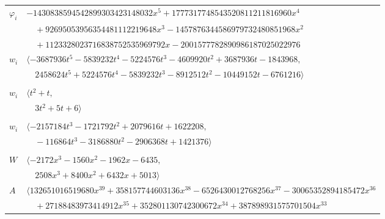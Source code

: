 \documentclass[11pt]{article}
\begin{document}
\begin{longtable}{@{}ll@{}}
$\varphi_i$ & $-1430838594542899303423148032x^{5}+1777317748543520811211816960x^{4}$\\
 & $\quad +92695053956354481112219648x^{3}-1457876344586979732480851968x^{2}$\\
 & $\quad +1123328023716838752535969792x-2001577782890986187025022976$\\
$w_i$ & $\langle -3687936t^{5}-5839232t^{4}-5224576t^{3}-4609920t^{2}+3687936t-1843968,$\\
 & $\quad 2458624t^{5}+5224576t^{4}-5839232t^{3}-8912512t^{2}-10449152t-6761216\rangle$\\
\addlinespace[2pt]
\multicolumn{2}{@{}p{0.97\textwidth}@{}}{$i=7$, $D_i=1$, $\varphi_i=1$, $\rho_{ij}$: $6{:}1, \allowbreak 12{:}1, \allowbreak 17{:}2, \allowbreak 20{:}2, \allowbreak 21{:}2, \allowbreak 37{:}3, \allowbreak 38{:}2$}\\
$w_i$ & $\langle t^{2}+t,$\\
 & $\quad 3t^{2}+5t+6\rangle$\\
\addlinespace[2pt]
\multicolumn{2}{@{}p{0.97\textwidth}@{}}{$i=8$, $D_i=8$, $\varphi_i=1$, $e_i=3$, $\rho_{ij}$: $0{:}3, \allowbreak 1{:}2, \allowbreak 3{:}3, \allowbreak 9{:}1, \allowbreak 16{:}2, \allowbreak 25{:}3, \allowbreak 26{:}2, \allowbreak 30{:}3, \allowbreak 32{:}1, \allowbreak 33{:}2, \allowbreak 37{:}2, \allowbreak 42{:}3, \allowbreak 44{:}3, \allowbreak 46{:}2$}\\
$w_i$ & $\langle -2157184t^{3}-1721792t^{2}+2079616t+1622208,$\\
 & $\quad -116864t^{3}-3186880t^{2}-2906368t+1421376\rangle$\\
\addlinespace[2pt]
\multicolumn{2}{@{}p{0.97\textwidth}@{}}{$i=9$, $D_i=296$, $\varphi_i=\tau(\Pi_{10})$, $\rho_{ij}$: $0{:}1, \allowbreak 1{:}1, \allowbreak 2{:}2, \allowbreak 8{:}3, \allowbreak 11{:}3, \allowbreak 12{:}2, \allowbreak 19{:}3, \allowbreak 21{:}2, \allowbreak 23{:}3, \allowbreak 25{:}1, \allowbreak 28{:}2, \allowbreak 30{:}1, \allowbreak 33{:}2, \allowbreak 34{:}1, \allowbreak 39{:}2, \allowbreak 40{:}2, \allowbreak 44{:}2, \allowbreak 45{:}2, \allowbreak 46{:}1$}\\
$W$ & $\langle -2172x^{3}-1560x^{2}-1962x-6435,$\\
 & $\quad 2508x^{3}+8400x^{2}+6432x+5013\rangle$\\
$A$ & $\langle 132651016519680x^{39}+358157744603136x^{38}-6526430012768256x^{37}-30065352894185472x^{36}$\\
 & $\quad +27188483973414912x^{35}+352801130742300672x^{34}+387898931575701504x^{33}$\\

\end{longtable}
\end{document}
